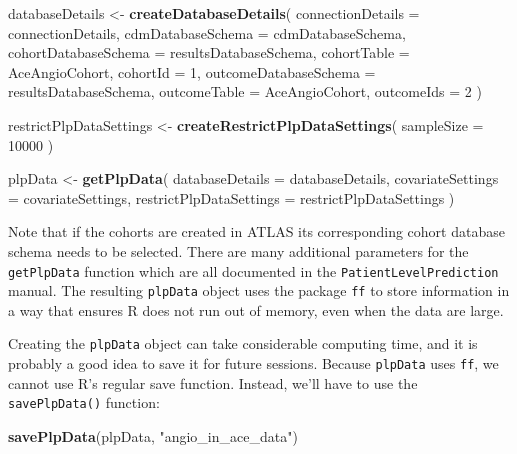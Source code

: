 \documentclass[
]{article}
\newenvironment{Shaded}{\begin{snugshade}}{\end{snugshade}}
\newcommand{\AttributeTok}[1]{\textcolor[rgb]{0.13,0.29,0.53}{#1}}
\newcommand{\DecValTok}[1]{\textcolor[rgb]{0.00,0.00,0.81}{#1}}
\newcommand{\FunctionTok}[1]{\textcolor[rgb]{0.13,0.29,0.53}{\textbf{#1}}}
\newcommand{\NormalTok}[1]{#1}
\newcommand{\OtherTok}[1]{\textcolor[rgb]{0.56,0.35,0.01}{#1}}
\newcommand{\StringTok}[1]{\textcolor[rgb]{0.31,0.60,0.02}{#1}}
\begin{document}
\begin{Shaded}
\begin{Highlighting}[]
\NormalTok{databaseDetails }\OtherTok{\textless{}{-}} \FunctionTok{createDatabaseDetails}\NormalTok{(}
  \AttributeTok{connectionDetails =}\NormalTok{ connectionDetails,}
  \AttributeTok{cdmDatabaseSchema =}\NormalTok{ cdmDatabaseSchema,}
  \AttributeTok{cohortDatabaseSchema =}\NormalTok{ resultsDatabaseSchema,}
  \AttributeTok{cohortTable =} \StringTok{\textquotesingle{}AceAngioCohort\textquotesingle{}}\NormalTok{,}
  \AttributeTok{cohortId =} \DecValTok{1}\NormalTok{,}
  \AttributeTok{outcomeDatabaseSchema =}\NormalTok{ resultsDatabaseSchema,}
  \AttributeTok{outcomeTable =} \StringTok{\textquotesingle{}AceAngioCohort\textquotesingle{}}\NormalTok{,}
  \AttributeTok{outcomeIds =} \DecValTok{2}
\NormalTok{  )}

\NormalTok{restrictPlpDataSettings }\OtherTok{\textless{}{-}} \FunctionTok{createRestrictPlpDataSettings}\NormalTok{(}
  \AttributeTok{sampleSize =} \DecValTok{10000}
\NormalTok{  )}

\NormalTok{plpData }\OtherTok{\textless{}{-}} \FunctionTok{getPlpData}\NormalTok{(}
  \AttributeTok{databaseDetails =}\NormalTok{ databaseDetails, }
  \AttributeTok{covariateSettings =}\NormalTok{ covariateSettings, }
  \AttributeTok{restrictPlpDataSettings =}\NormalTok{ restrictPlpDataSettings}
\NormalTok{  )}
\end{Highlighting}
\end{Shaded}

Note that if the cohorts are created in ATLAS its corresponding cohort
database schema needs to be selected. There are many additional
parameters for the \texttt{getPlpData} function which are all documented
in the \texttt{PatientLevelPrediction} manual. The resulting
\texttt{plpData} object uses the package \texttt{ff} to store
information in a way that ensures R does not run out of memory, even
when the data are large.

Creating the \texttt{plpData} object can take considerable computing
time, and it is probably a good idea to save it for future sessions.
Because \texttt{plpData} uses \texttt{ff}, we cannot use R's regular
save function. Instead, we'll have to use the \texttt{savePlpData()}
function:

\begin{Shaded}
\begin{Highlighting}[]
    \FunctionTok{savePlpData}\NormalTok{(plpData, }\StringTok{"angio\_in\_ace\_data"}\NormalTok{)}
\end{Highlighting}
\end{Shaded}
\end{document}
